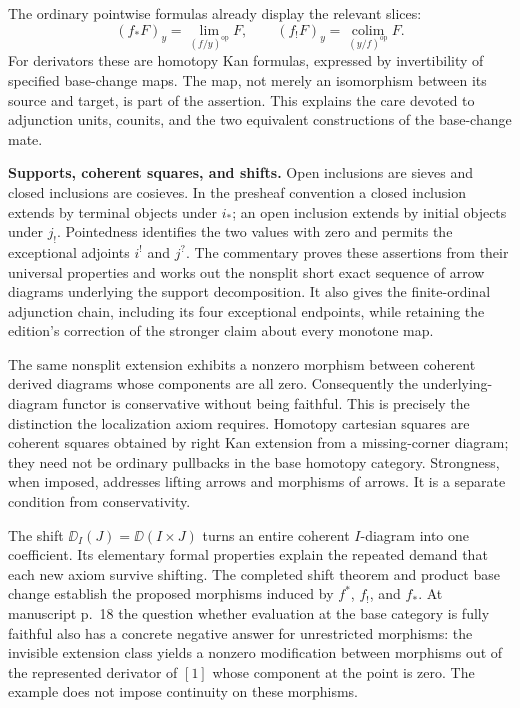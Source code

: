 The ordinary pointwise formulas already display the relevant slices:
\[
 (f_*F)_y=\lim_{(f/y)^{\mathrm{op}}}F,
 \qquad
 (f_!F)_y=\operatorname*{colim}_{(y/f)^{\mathrm{op}}}F.
\]
For derivators these are homotopy Kan formulas, expressed by invertibility of specified base-change maps. The map, not merely an isomorphism between its source and target, is part of the assertion. This explains the care devoted to adjunction units, counits, and the two equivalent constructions of the base-change mate.

\medskip\noindent\textbf{Supports, coherent squares, and shifts.}
Open inclusions are sieves and closed inclusions are cosieves. In the presheaf convention a closed inclusion extends by terminal objects under $i_*$; an open inclusion extends by initial objects under $j_!$. Pointedness identifies the two values with zero and permits the exceptional adjoints $i^!$ and $j^?$. The commentary proves these assertions from their universal properties and works out the nonsplit short exact sequence of arrow diagrams underlying the support decomposition. It also gives the finite-ordinal adjunction chain, including its four exceptional endpoints, while retaining the edition's correction of the stronger claim about every monotone map.

The same nonsplit extension exhibits a nonzero morphism between coherent derived diagrams whose components are all zero. Consequently the underlying-diagram functor is conservative without being faithful. This is precisely the distinction the localization axiom requires. Homotopy cartesian squares are coherent squares obtained by right Kan extension from a missing-corner diagram; they need not be ordinary pullbacks in the base homotopy category. Strongness, when imposed, addresses lifting arrows and morphisms of arrows. It is a separate condition from conservativity.

The shift $\DD_I(J)=\DD(I\times J)$ turns an entire coherent $I$-diagram into one coefficient. Its elementary formal properties explain the repeated demand that each new axiom survive shifting. The completed shift theorem and product base change establish the proposed morphisms induced by $f^*$, $f_!$, and $f_*$. At manuscript p.~18 the question whether evaluation at the base category is fully faithful also has a concrete negative answer for unrestricted morphisms: the invisible extension class yields a nonzero modification between morphisms out of the represented derivator of $[1]$ whose component at the point is zero. The example does not impose continuity on these morphisms.

